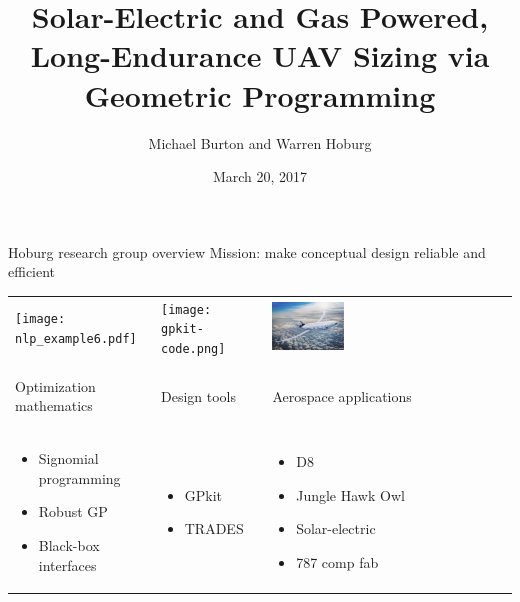 \documentclass{beamer}
\title{Solar-Electric and Gas Powered, Long-Endurance UAV Sizing via Geometric Programming}
\author{Michael Burton and Warren Hoburg}
\institute{Massachusetts Institute of Technology}
\date{March 20, 2017}
\begin{document}
 
\graphicspath{{./figs/}}

\begin{frame}
    \titlepage
\end{frame}

\begin{frame}{Hoburg research group overview}
Mission: make conceptual design reliable and efficient\\
\begin{tabularx}{\textwidth}{XXX}
\texttt{[image: nlp\_example6.pdf]} &
\texttt{[image: gpkit-code.png]} &
\includegraphics[width=0.31\textwidth]{D8-day.jpg} \\ [-3.0ex]
\begin{mdframed}[roundcorner=0pt]
\parbox[t][0.85cm][t]{\linewidth}{\centering
\vfill
Optimization mathematics
\vfill
}
\end{mdframed} &
\begin{mdframed}[roundcorner=0pt]
\parbox[t][0.85cm][t]{\linewidth}{\centering
\vfill
Design tools
\vfill
}
\end{mdframed} &
\begin{mdframed}[roundcorner=0pt]
\parbox[t][0.85cm][t]{\linewidth}{\centering
\vfill
Aerospace applications
\vfill
}
\end{mdframed} \\ [-3.5ex]
\begin{itemize}
\item Signomial programming
\item Robust GP
\item Black-box interfaces
\end{itemize} &
\begin{itemize}
\item GPkit
\item TRADES
\end{itemize} &
\begin{itemize}
\item D8
\item Jungle Hawk Owl
\item Solar-electric
\item 787 comp fab
\end{itemize}
\end{tabularx}
\end{frame}
 
\end{document}

